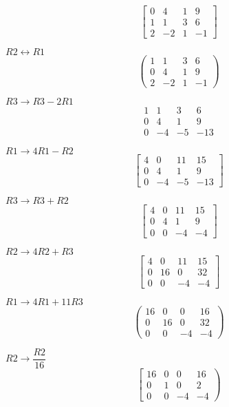 \documentclass[a4paper,11pt]{article}
\begin{document}
\[ \left[\begin{array}{rrr|r} 0 & 4 & 1 & 9 \\ 1 & 1 & 3 & 6 \\ 2 & -2 & 1 & -1 \end{array}\right] \]

\( R2 \longleftrightarrow R1 \)
\[ \left(\begin{array}{rrr|r} 1 & 1 & 3 & 6 \\ 0 & 4 & 1 & 9 \\ 2 & -2 & 1 & -1 \end{array}\right) \]

\( R3 \rightarrow R3 - 2R1 \)
\[ \begin{array}{rrrr} 1 & 1 & 3 & 6 \\ 0 & 4 & 1 & 9 \\ 0 & -4 & -5 & -13 \end{array} \]

\( R1 \rightarrow 4R1 - R2 \)
\[ \left[\begin{array}{rrr|r} 4 & 0 & 11 & 15 \\ 0 & 4 & 1 & 9 \\ 0 & -4 & -5 & -13 \end{array}\right] \]

\( R3 \rightarrow R3 + R2 \)
\[ \left[\begin{array}{rrr|r} 4 & 0 & 11 & 15 \\ 0 & 4 & 1 & 9 \\ 0 & 0 & -4 & -4 \end{array}\right] \]

\( R2 \rightarrow 4R2 + R3 \)
\[ \left[\begin{array}{rrr|r} 4 & 0 & 11 & 15 \\ 0 & 16 & 0 & 32 \\ 0 & 0 & -4 & -4 \end{array}\right] \]

\( R1 \rightarrow 4R1 + 11R3 \)
\[ \left(\begin{array}{rrr|r} 16 & 0 & 0 & 16 \\ 0 & 16 & 0 & 32 \\ 0 & 0 & -4 & -4 \end{array}\right) \]

\( R2 \rightarrow \dfrac{R2}{16} \)
\[ \left[\left.\begin{array}{rrr|r} 16 & 0 & 0 & 16 \\ 0 & 1 & 0 & 2 \\ 0 & 0 & -4 & -4 \end{array}\right)\right. \]
\end{document}
